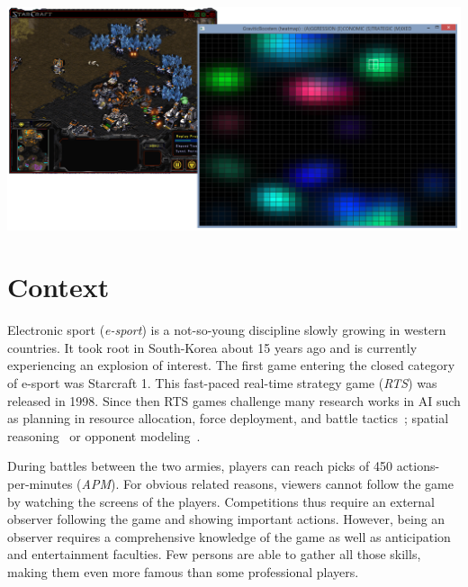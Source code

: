 \documentclass{jfsma}
\begin{document}
	\maketitle
	
	\begin{strip}
  \centering\noindent
  \includegraphics[scale=0.35]{gfx/GB}
  \vspace{0.3cm}
\end{strip}

	\section{Context}
    	Electronic sport (\textit{e-sport}) is a not-so-young discipline slowly growing in western countries.
        It took root in South-Korea about 15 years ago and is currently experiencing an explosion of interest.
        The first game entering the closed category of e-sport was Starcraft 1. %
        This fast-paced real-time strategy game (\textit{RTS}) was released in 1998.
	Since then RTS games challenge many research works in AI such as planning in resource allocation, force deployment, and battle tactics~\cite{weber2009case,mccoy2008integrated}; spatial reasoning~\cite{forbus2002qualitative} or opponent modeling~\cite{schadd2007opponent}.
        
        During battles between the two armies, players can reach picks of 450 actions-per-minutes (\textit{APM}).
        For obvious related reasons, viewers cannot follow the game by watching the screens of the players.
        Competitions thus require an external observer following the game and showing important actions.
        However, being an observer requires a comprehensive knowledge of the game as well as anticipation and entertainment faculties. 
        Few persons are able to gather all those skills, making them even more famous than some professional players.
        
\end{document}
